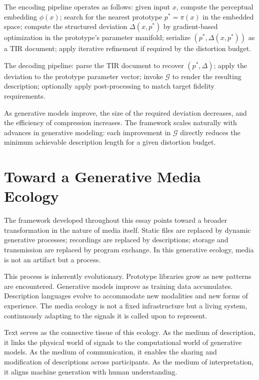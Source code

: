 \documentclass[12pt,a4paper]{article}
\theoremstyle{definition}
\theoremstyle{remark}
\begin{document}
The encoding pipeline operates as follows: given input $x$, compute the perceptual embedding $\phi(x)$; search for the nearest prototype $p^* = \pi(x)$ in the embedded space; compute the structured deviation $\Delta(x, p^*)$ by gradient-based optimization in the prototype's parameter manifold; serialize $(p^*, \Delta(x, p^*))$ as a TIR document; apply iterative refinement if required by the distortion budget.

The decoding pipeline: parse the TIR document to recover $(p^*, \Delta)$; apply the deviation to the prototype parameter vector; invoke $\mathcal{G}$ to render the resulting description; optionally apply post-processing to match target fidelity requirements.

As generative models improve, the size of the required deviation decreases, and the efficiency of compression increases. The framework scales naturally with advances in generative modeling: each improvement in $\mathcal{G}$ directly reduces the minimum achievable description length for a given distortion budget.

\section{Toward a Generative Media Ecology}
\label{sec:ecology}

The framework developed throughout this essay points toward a broader transformation in the nature of media itself. Static files are replaced by dynamic generative processes; recordings are replaced by descriptions; storage and transmission are replaced by program exchange. In this generative ecology, media is not an artifact but a process.

This process is inherently evolutionary. Prototype libraries grow as new patterns are encountered. Generative models improve as training data accumulates. Description languages evolve to accommodate new modalities and new forms of experience. The media ecology is not a fixed infrastructure but a living system, continuously adapting to the signals it is called upon to represent.

Text serves as the connective tissue of this ecology. As the medium of description, it links the physical world of signals to the computational world of generative models. As the medium of communication, it enables the sharing and modification of descriptions across participants. As the medium of interpretation, it aligns machine generation with human understanding.
\end{document}
